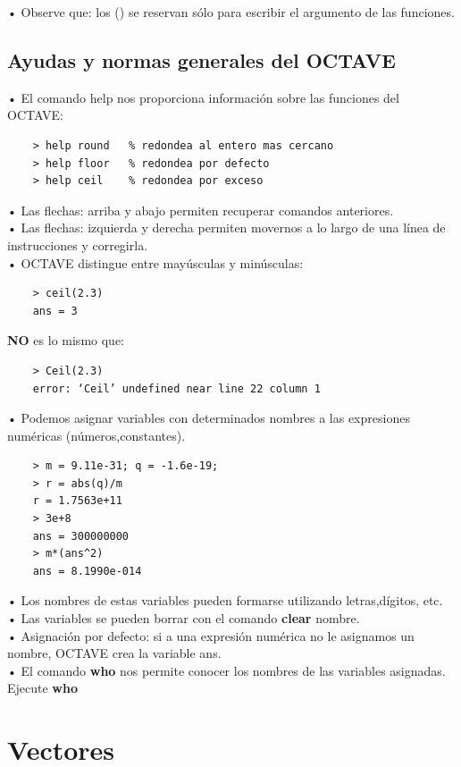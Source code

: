 \documentclass[a4,12pt]{article}
\begin{document}
• Observe que: los () se reservan sólo para escribir el argumento de las funciones.\\

\subsection{Ayudas y normas generales del OCTAVE}

• El comando help nos proporciona información sobre las funciones del OCTAVE:\\
\begin{verbatim}
    > help round   % redondea al entero mas cercano
    > help floor   % redondea por defecto
    > help ceil    % redondea por exceso
\end{verbatim}
• Las flechas: arriba y abajo permiten recuperar comandos anteriores.\\
• Las flechas: izquierda y derecha permiten movernos a lo largo de una línea de instrucciones y corregirla.\\
• OCTAVE distingue entre mayúsculas y minúsculas:\\
\begin{verbatim}
    > ceil(2.3)
    ans = 3
\end{verbatim}
\textbf{NO} es lo mismo que:\\
\begin{verbatim}
    > Ceil(2.3)
    error: ‘Ceil’ undefined near line 22 column 1
\end{verbatim}
• Podemos asignar variables con determinados nombres a las expresiones numéricas (números,constantes).\\
\begin{verbatim}
    > m = 9.11e-31; q = -1.6e-19;
    > r = abs(q)/m
    r = 1.7563e+11
    > 3e+8
    ans = 300000000
    > m*(ans^2)
    ans = 8.1990e-014
\end{verbatim}
• Los nombres de estas variables pueden formarse utilizando letras,dígitos, etc.\\
• Las variables se pueden borrar con el comando \textbf{clear} nombre.\\
• Asignación por defecto: si a una expresión numérica no le asignamos un nombre, OCTAVE crea la variable ans.\\
• El comando \textbf{who} nos permite conocer los nombres de las variables asignadas. Ejecute \textbf{who}\\

\section{Vectores}
\end{document}
